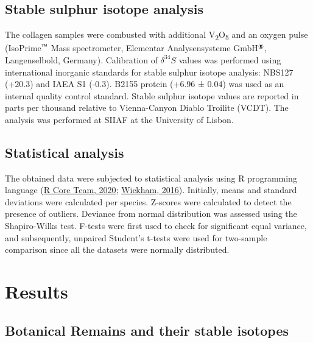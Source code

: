 \documentclass[preprint, 3p, authoryear]{elsarticle} %
\begin{document}
\hypertarget{stable-sulphur-isotope-analysis}{%
\subsection{Stable sulphur isotope analysis}\label{stable-sulphur-isotope-analysis}}

The collagen samples were combusted with additional V\textsubscript{2}O\textsubscript{5} and an oxygen pulse (IsoPrime\(^\text{\texttrademark}\) Mass spectrometer, Elementar Analysensysteme GmbH\(^\text{\textregistered}\), Langenselbold, Germany). Calibration of \(\delta ^{34}S\) values was performed using international inorganic standards for stable sulphur isotope analysis: NBS127 (+20.3\text{\textperthousand}) and IAEA S1 (-0.3\text{\textperthousand}). B2155 protein (+6.96 ± 0.04\text{\textperthousand}) was used as an internal quality control standard. Stable sulphur isotope values are reported in parts per thousand relative to Vienna-Canyon Diablo Troilite (VCDT). The analysis was performed at SIIAF at the University of Lisbon.

\hypertarget{statistical-analysis}{%
\subsection{Statistical analysis}\label{statistical-analysis}}

The obtained data were subjected to statistical analysis using R programming language (\protect\hyperlink{ref-rcoreteam20}{R Core Team, 2020}; \protect\hyperlink{ref-wickham16}{Wickham, 2016}). Initially, means and standard deviations were calculated per species. Z-scores were calculated to detect the presence of outliers. Deviance from normal distribution was assessed using the Shapiro-Wilks test. F-tests were first used to check for significant equal variance, and subsequently, unpaired Student's t-tests were used for two-sample comparison since all the datasets were normally distributed.

\hypertarget{results}{%
\section{Results}\label{results}}

\hypertarget{botanical-remains-and-their-stable-isotopes}{%
\subsection{Botanical Remains and their stable isotopes}\label{botanical-remains-and-their-stable-isotopes}}
\end{document}
